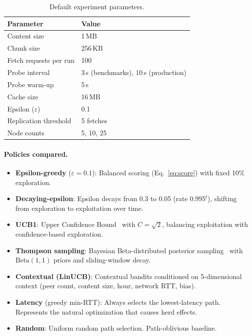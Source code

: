 \documentclass[sigconf,nonacm]{acmart}
\begin{document}
\begin{table}[t]
\caption{Default experiment parameters.}
\label{tab:params}
\centering
\begin{tabular}{ll}
\toprule
Parameter & Value \\
\midrule
Content size & 1\,MB \\
Chunk size & 256\,KB \\
Fetch requests per run & 100 \\
Probe interval & 3\,s (benchmarks), 10\,s (production) \\
Probe warm-up & 5\,s \\
Cache size & 16\,MB \\
Epsilon ($\varepsilon$) & 0.1 \\
Replication threshold & 5 fetches \\
Node counts & 5, 10, 25 \\
\bottomrule
\end{tabular}
\end{table}

\paragraph{Policies compared.}
\begin{itemize}
\item \textbf{Epsilon-greedy} ($\varepsilon = 0.1$): Balanced scoring (Eq.~\ref{eq:score}) with fixed 10\% exploration.
\item \textbf{Decaying-epsilon}: Epsilon decays from 0.3 to 0.05 (rate 0.995$^t$), shifting from exploration to exploitation over time.
\item \textbf{UCB1}: Upper Confidence Bound~\cite{auer2002bandit} with $C = \sqrt{2}$, balancing exploitation with confidence-based exploration.
\item \textbf{Thompson sampling}: Bayesian Beta-distributed posterior sampling~\cite{thompson1933likelihood} with $\text{Beta}(1,1)$ priors and sliding-window decay.
\item \textbf{Contextual (LinUCB)}: Contextual bandits conditioned on 5-dimensional context (peer count, content size, hour, network RTT, bias).
\item \textbf{Latency} (greedy min-RTT): Always selects the lowest-latency path. Represents the natural optimization that causes herd effects.
\item \textbf{Random}: Uniform random path selection. Path-oblivious baseline.
\end{itemize}
\end{document}
